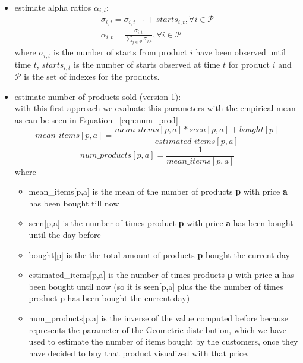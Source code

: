 \begin{itemize}
    \item estimate alpha ratios $\alpha_{i, t}$:
    \begin{align}
        \sigma_{i, t} = \sigma_{i, t - 1} + starts_{i, t}, \forall i \in \mathcal{P}\\
        \alpha_{i, t} = \frac{\sigma_{i, t}}{\sum_{j \in \mathcal{P}}\sigma_{j, t}},  \forall i \in \mathcal{P}
    \end{align}
    where $\sigma_{i, t}$ is the number of starts from product $i$ have been observed until time $t$, $starts_{i, t}$ is the number of starts observed at time $t$ for product $i$ and $\mathcal{P}$ is the set of indexes for the products.
    \item estimate number of products sold (version 1):\\
    with this first approach we evaluate this parameters with the empirical mean as can be seen in Equation ~\ref{eqn:num_prod} \begin{equation}
        \label{eqn:mean_items}
        mean\_items[p,a] = \frac{mean\_items[p,a] * seen[p,a] + bought[p]}{estimated\_items[p,a]}
    \end{equation}\begin{equation}
        \label{eqn:num_prod}
        num\_products[p,a] = \frac{1}{mean\_items[p,a]}
    \end{equation}where\begin{itemize}
        \item mean\_items[p,a] is the mean of the number of products {\bf p} with price {\bf a} has been bought till now
        \item seen[p,a] is the number of times product {\bf p} with price {\bf a} has been bought until the day before
        \item bought[p] is the the total amount of products {\bf p} bought the current day
        \item estimated\_items[p,a] is the number of times products {\bf p} with price {\bf a} has been bought until now (so it is seen[p,a] plus the the number of times product p has been bought the current day)
        \item num\_products[p,a] is the inverse of the value computed before because represents the parameter of the Geometric distribution, which we have used to estimate the number of items bought by the customers, once they have decided to buy that product visualized with that price.
    \end{itemize}

\end{itemize}
